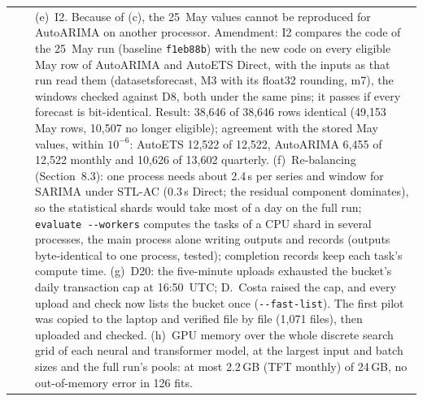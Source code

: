 \documentclass[11pt,a4paper]{article}
\newcommand{\code}[1]{\texttt{#1}}
\begin{document}
\begin{longtable}{@{}p{1.3cm} p{1.9cm} p{11.8cm}@{}}
 & & (e)~I2. Because of (c), the 25~May values cannot be reproduced for AutoARIMA on another processor. Amendment: I2 compares the code of the 25~May run (baseline \code{f1eb88b}) with the new code on every eligible May row of AutoARIMA and AutoETS Direct, with the inputs as that run read them (datasetsforecast, M3 with its float32 rounding, m7), the windows checked against D8, both under the same pins; it passes if every forecast is bit-identical. Result: 38,646 of 38,646 rows identical (49,153 May rows, 10,507 no longer eligible); agreement with the stored May values, within $10^{-6}$: AutoETS 12,522 of 12,522, AutoARIMA 6,455 of 12,522 monthly and 10,626 of 13,602 quarterly. (f)~Re-balancing (Section~8.3): one process needs about 2.4\,s per series and window for SARIMA under STL-AC (0.3\,s Direct; the residual component dominates), so the statistical shards would take most of a day on the full run; \code{evaluate -{}-workers} computes the tasks of a CPU shard in several processes, the main process alone writing outputs and records (outputs byte-identical to one process, tested); completion records keep each task's compute time. (g)~D20: the five-minute uploads exhausted the bucket's daily transaction cap at 16:50~UTC; D.\ Costa raised the cap, and every upload and check now lists the bucket once (\code{-{}-fast-list}). The first pilot was copied to the laptop and verified file by file (1,071 files), then uploaded and checked. (h)~GPU memory over the whole discrete search grid of each neural and transformer model, at the largest input and batch sizes and the full run's pools: at most 2.2\,GB (TFT monthly) of 24\,GB, no out-of-memory error in 126 fits. \\

\end{longtable}
\end{document}
